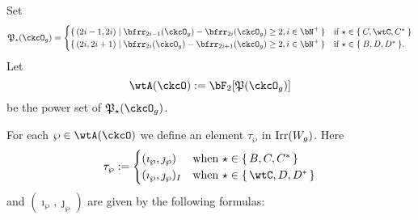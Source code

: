 \documentclass[12pt,a4paper]{amsart}
\numberwithin{equation}{section}
\theoremstyle{remark}
\def\Irr{\mathrm{Irr}}
\def\CPP{\mathfrak{P}}
\def\CPPs{\mathfrak{P}_{\star}}
\def\imathp{\imath_{\sP}}
\def\jmathp{\jmath_{\sP}}
\def\sP{\wp}
\begin{document}
  Set
  \[
    \CPPs(\ckcO_{g}) =
    \begin{cases}
      \set{(2i-1,2i)| \bfrr_{2i-1}(\ckcO_{g})-
        \bfrr_{2i}(\ckcO_{g})\geq 2, %
        i\in \bN^{+}} & \text{if $\star\in \Set{C,\wtC,C^{*}}$}\\
    \set{(2i,2i+1)| \bfrr_{2i}(\ckcO_{g})- \bfrr_{2i+1}(\ckcO_{g})\geq 2, %
      i\in \bN^{+}} & \text{if $\star\in \Set{B,D,D^{*}}$}.
    \end{cases}
  \]
  Let
  \[
    \wtA(\ckcO) := \bF_{2}[\CPP(\ckcO_{g})]
  \] be the power set of $\CPPs(\ckcO_{g})$.

  For each $\sP\in \wtA(\ckcO)$ we define an element $\tau_{\sP}$ in $\Irr(\Wg)$.
  Here
  \[
    \tau_{\sP} :=
    \begin{cases}
      (\imathp,\jmathp) & \text{when } \star \in \set{B,C, C^{*} } \\
      (\imathp,\jmathp)_{I} & \text{when } \star \in \set{\wtC,D,D^{*}}
    \end{cases}
  \]
  and $(\imathp, \jmathp)$ are given by the following formulas:
\end{document}
